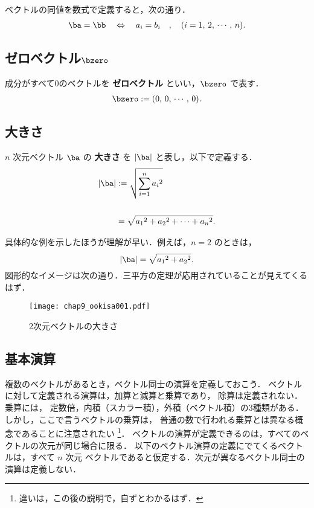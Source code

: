         ベクトルの同値を数式で定義すると，次の通り．
        \begin{align}
            \ba=\bb
            \quad\Leftrightarrow\quad
            a_{i}=b_{i}\quad,\quad(i=1,\,2,\,\cdots,\,n).
        \end{align}

        \subsection{ゼロベクトル$\bzero$}
        成分がすべて0のベクトルを \textbf{ゼロベクトル} といい，$\bzero$ で表す．
        \begin{align}
            \bzero := (0,\,0,\,\cdots,\,0).
        \end{align}

        \subsection{大きさ}
        $n$ 次元ベクトル $\ba$ の \textbf{大きさ} を $|\ba|$ と表し，以下で定義する．
        \begin{align}
            |\ba| &:= \sqrt{\sum_{i=1}^{n} {a_{i}}^{2}}  \\ \notag \\
                  &=  \sqrt{{a_{1}}^{2} + {a_{2}}^{2} + \cdots + {a_{n}}^{2}}. \notag
        \end{align}

        具体的な例を示したほうが理解が早い．例えば，$n=2$ のときは，
        \begin{equation*}
            |\ba| = \sqrt{{{a}_{1}}^{2}+{{a}_{2}}^{2}}.
        \end{equation*}
        図形的なイメージは次の通り．三平方の定理が応用されていることが見えてくるはず．
        \begin{figure}[htbp]
            \begin{center}
                \texttt{[image: chap9\_ookisa001.pdf]}
                \caption{2次元ベクトルの大きさ}
                \label{fig:chap9_ookisa001}
            \end{center}
        \end{figure}

        \subsection{基本演算}
        複数のベクトルがあるとき，ベクトル同士の演算を定義しておこう．
        ベクトルに対して定義される演算は，加算と減算と乗算であり，
        除算は定義されない．乗算には，
        定数倍，内積（スカラー積），外積（ベクトル積）の3種類がある．
        しかし，ここで言うベクトルの乗算は，
        普通の数で行われる乗算とは異なる概念であることに注意されたい
            \footnote{
                違いは，この後の説明で，自ずとわかるはず．
            }．
        ベクトルの演算が定義できるのは，すべてのベクトルの次元が同じ場合に限る．
        以下のベクトル演算の定義にでてくるベクトルは，すべて $n$ 次元
        ベクトルであると仮定する．次元が異なるベクトル同士の演算は定義しない．


